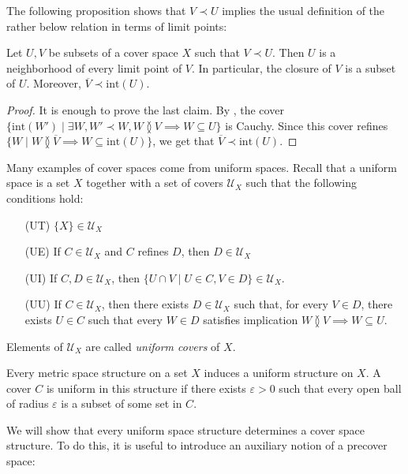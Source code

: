 \documentclass[reqno]{amsart}
\newcommand{\axitem}[1]{\phantomsection \label{ax:#1}}
\theoremstyle{definition}
\theoremstyle{remark}
\numberwithin{figure}{section}
\newcommand{\overlap}[2]{#1 \between #2}
\newcommand{\rb}{\prec}
\begin{document}
The following proposition shows that $V \rb U$ implies the usual definition of the rather below relation in terms of limit points:

\begin{prop}[rb-closure]
Let $U,V$ be subsets of a cover space $X$ such that $V \rb U$.
Then $U$ is a neighborhood of every limit point of $V$.
In particular, the closure of $V$ is a subset of $U$.
Moreover, $\overline{V} \rb \mathrm{int}(U)$.
\end{prop}
\begin{proof}
It is enough to prove the last claim.
By , the cover $\{ \mathrm{int}(W') \mid \exists W, W' \rb W, \overlap{W}{V} \implies W \subseteq U \}$ is Cauchy.
Since this cover refines $\{ W \mid \overlap{W}{\overline{V}} \implies W \subseteq \mathrm{int}(U) \}$, we get that $\overline{V} \rb \mathrm{int}(U)$.
\end{proof}

Many examples of cover spaces come from uniform spaces.
Recall that a uniform space is a set $X$ together with a set of covers $\mathcal{U}_X$ such that the following conditions hold:
\begin{itemize}
\item[(UT)] $\{ X \} \in \mathcal{U}_X$
\item[(UE)] If $C \in \mathcal{U}_X$ and $C$ refines $D$, then $D \in \mathcal{U}_X$
\item[(UI)] \axitem{UI} If $C,D \in \mathcal{U}_X$, then $\{ U \cap V \mid U \in C, V \in D \} \in \mathcal{U}_X$.
\item[(UU)] \axitem{UU} If $C \in \mathcal{U}_X$, then there exists $D \in \mathcal{U}_X$ such that, for every $V \in D$,
there exists $U \in C$ such that every $W \in D$ satisfies implication $\overlap{W}{V} \implies W \subseteq U$.
\end{itemize}
Elements of $\mathcal{U}_X$ are called \emph{uniform covers} of $X$.

\begin{example}
Every metric space structure on a set $X$ induces a uniform structure on $X$.
A cover $C$ is uniform in this structure if there exists $\varepsilon > 0$ such that every open ball of radius $\varepsilon$ is a subset of some set in $C$.
\end{example}

We will show that every uniform space structure determines a cover space structure.
To do this, it is useful to introduce an auxiliary notion of a precover space:
\end{document}
